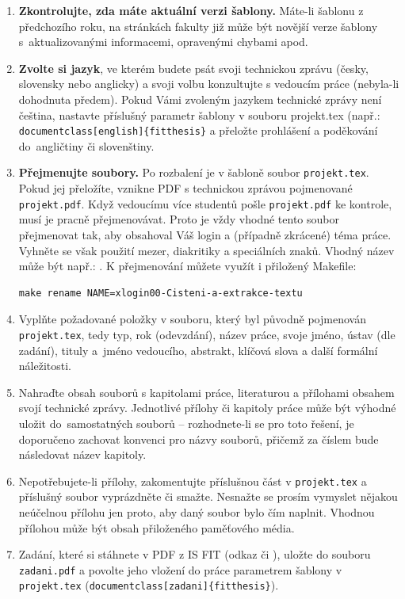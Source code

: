 \begin{enumerate}
  \item \textbf{Zkontrolujte, zda máte aktuální verzi šablony.} Máte-li šablonu z předchozího roku, na stránkách fakulty již může být novější verze šablony s~aktualizovanými informacemi, opravenými chybami apod.
  \item \textbf{Zvolte si jazyk}, ve kterém budete psát svoji technickou zprávu (česky, slovensky nebo anglicky) a svoji volbu konzultujte s vedoucím práce (nebyla-li dohodnuta předem). Pokud Vámi zvoleným jazykem technické zprávy není čeština, nastavte příslušný parametr šablony v souboru projekt.tex (např.: \verb|documentclass[english]{fitthesis}| a přeložte prohlášení a poděkování do~angličtiny či slovenštiny.
  \item \textbf{Přejmenujte soubory.} Po rozbalení je v šabloně soubor \texttt{projekt.tex}. Pokud jej přeložíte, vznikne PDF s technickou zprávou pojmenované \texttt{projekt.pdf}. Když vedoucímu více studentů pošle \texttt{projekt.pdf} ke kontrole, musí je pracně přejmenovávat. Proto je vždy vhodné tento soubor přejmenovat tak, aby obsahoval Váš login a (případně zkrácené) téma práce. Vyhněte se však použití mezer, diakritiky a speciálních znaků. Vhodný název může být např.: . K přejmenování můžete využít i přiložený Makefile:
\begin{verbatim}
make rename NAME=xlogin00-Cisteni-a-extrakce-textu
\end{verbatim}
  \item Vyplňte požadované položky v souboru, který byl původně pojmenován \texttt{projekt.tex}, tedy typ, rok (odevzdání), název práce, svoje jméno, ústav (dle zadání), tituly a~jméno vedoucího, abstrakt, klíčová slova a další formální náležitosti.
  \item Nahraďte obsah souborů s kapitolami práce, literaturou a přílohami obsahem svojí technické zprávy. Jednotlivé přílohy či kapitoly práce může být výhodné uložit do~samostatných souborů -- rozhodnete-li se pro toto řešení, je doporučeno zachovat konvenci pro názvy souborů, přičemž za číslem bude následovat název kapitoly.
  \item Nepotřebujete-li přílohy, zakomentujte příslušnou část v \texttt{projekt.tex} a příslušný soubor vyprázdněte či smažte. Nesnažte se prosím vymyslet nějakou neúčelnou přílohu jen proto, aby daný soubor bylo čím naplnit. Vhodnou přílohou může být obsah přiloženého paměťového média.
  \item Zadání, které si stáhnete v PDF z IS FIT (odkaz  či ), uložte do souboru \texttt{zadani.pdf} a povolte jeho vložení do práce parametrem šablony v \texttt{projekt.tex} (\verb|documentclass[zadani]{fitthesis}|).

\end{enumerate}
